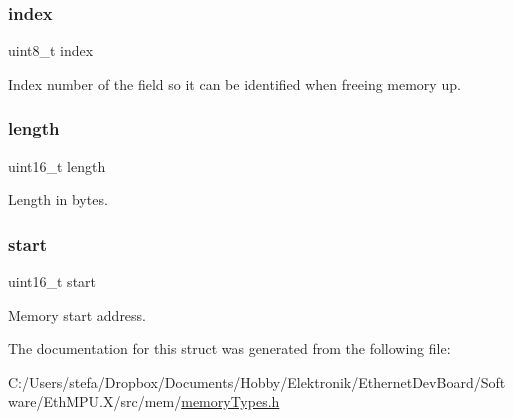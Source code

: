 \subsubsection{\texorpdfstring{index}{index}}
{\footnotesize\ttfamily uint8\+\_\+t index}



Index number of the field so it can be identified when freeing memory up. 

\mbox{\label{structmemory_field___a1892eba2086d12ac2b09005aeb09ea3b}} 
\subsubsection{\texorpdfstring{length}{length}}
{\footnotesize\ttfamily uint16\+\_\+t length}



Length in bytes. 

\mbox{\label{structmemory_field___a171a2b5d11b1a5891c38a98ac731a161}} 
\subsubsection{\texorpdfstring{start}{start}}
{\footnotesize\ttfamily uint16\+\_\+t start}



Memory start address. 



The documentation for this struct was generated from the following file\+:\begin{DoxyCompactItemize}
\item 
C\+:/\+Users/stefa/\+Dropbox/\+Documents/\+Hobby/\+Elektronik/\+Ethernet\+Dev\+Board/\+Software/\+Eth\+M\+P\+U.\+X/src/mem/\mbox{\hyperlink{memory_types_8h}{memory\+Types.\+h}}\end{DoxyCompactItemize}
